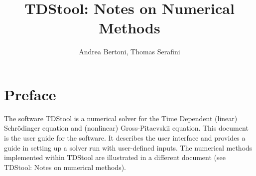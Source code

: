 \documentclass[a4paper,11pt]{article}
\title{TDStool: Notes on Numerical Methods}
\author{Andrea Bertoni, Thomas Serafini}
\begin{document}
\begin{titlepage}



\vspace{40mm}

\vspace{20mm}

\vspace{60mm}

\vspace{10mm}

\normalsize

\newpage

\pagestyle{empty}
\mbox{}
\end{titlepage}

\section*{Preface}
The software TDStool is a numerical solver for the Time Dependent (linear)
Schr\"odinger equation and (nonlinear) Gross-Pitaevskii equation.
This document is the user guide for the software.
It describes the user interface and provides a guide in setting
up a solver run with user-defined inputs.
The numerical methods implemented within TDStool are illustrated
in a different document (see TDStool: Notes on numerical methods).
\end{document}
